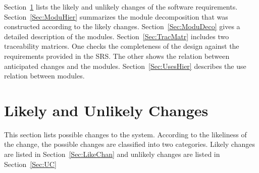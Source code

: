 \documentclass[12pt]{article}
\begin{document}
Section~\ref{Sec:LikeandUnliChan}  lists the likely and unlikely changes of the software requirements. Section~\ref{Sec:ModuHier}  summarizes the module decomposition that was constructed according to the likely changes. Section~\ref{Sec:ModuDeco}  gives a detailed description of the modules. Section~\ref{Sec:TracMatr}  includes two traceability matrices. One checks the completeness of the design against the requirements provided in the SRS. The other shows the relation between anticipated changes and the modules. Section~\ref{Sec:UsesHier}  describes the use relation between modules.
\section{Likely and Unlikely Changes}
\label{Sec:LikeandUnliChan}
This section lists possible changes to the system. According to the likeliness of the change, the possible changes are classified into two categories. Likely changes are listed in Section~\ref{Sec:LikeChan} and unlikely changes are listed in Section~\ref{Sec:UC}
\end{document}
